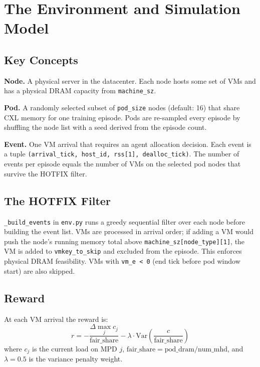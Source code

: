 \documentclass[11pt]{article}
\begin{document}
\section{The Environment and Simulation Model}

\subsection{Key Concepts}

\textbf{Node.} A physical server in the datacenter. Each node hosts
some set of VMs and has a physical DRAM capacity from
\texttt{machine\_sz}.

\textbf{Pod.} A randomly selected subset of \texttt{pod\_size} nodes
(default: 16) that share CXL memory for one training episode. Pods
are re-sampled every episode by shuffling the node list with a
seed derived from the episode count.

\textbf{Event.} One VM arrival that requires an agent allocation
decision. Each event is a tuple
\texttt{(arrival\_tick, host\_id, rss[1], dealloc\_tick)}.
The number of events per episode equals the number of VMs on the
selected pod nodes that survive the HOTFIX filter.

\subsection{The HOTFIX Filter}

\texttt{\_build\_events} in \texttt{env.py} runs a greedy sequential
filter over each node before building the event list. VMs are
processed in arrival order; if adding a VM would push the node's
running memory total above \texttt{machine\_sz[node\_type][1]},
the VM is added to \texttt{vmkey\_to\_skip} and excluded from the
episode. This enforces physical DRAM feasibility. VMs with
\texttt{vm\_e < 0} (end tick before pod window start) are also
skipped.

\subsection{Reward}

At each VM arrival the reward is:
\[
r = -\frac{\Delta \max_j c_j}{\text{fair\_share}} - \lambda \cdot
\mathrm{Var}\!\left(\frac{c}{\text{fair\_share}}\right)
\]
where $c_j$ is the current load on MPD $j$,
$\text{fair\_share} = \text{pod\_dram} / \text{num\_mhd}$,
and $\lambda = 0.5$ is the variance penalty weight.
\end{document}
